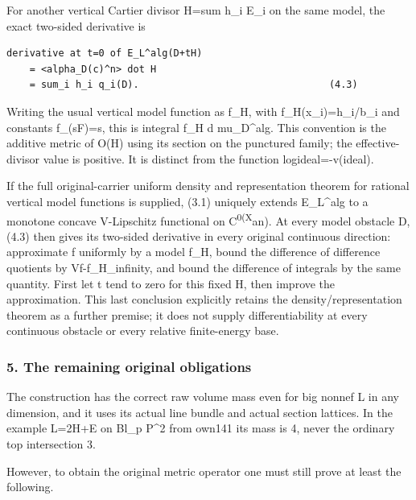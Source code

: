\documentclass[
  10pt,
]{article}
\begin{document}
For another vertical Cartier divisor H=sum h\_i E\_i on the same model,
the exact two-sided derivative is

\begin{verbatim}
derivative at t=0 of E_L^alg(D+tH)
    = <alpha_D(c)^n> dot H
    = sum_i h_i q_i(D).                                 (4.3)
\end{verbatim}

Writing the usual vertical model function as f\_H, with
f\_H(x\_i)=h\_i/b\_i and constants f\_(sF)=s, this is integral f\_H d
mu\_D\^{}alg. This convention is the additive metric of O(H) using its
section on the punctured family; the effective-divisor value is
positive. It is distinct from the function
log\textbar ideal\textbar=-v(ideal).

If the full original-carrier uniform density and representation theorem
for rational vertical model functions is supplied, (3.1) uniquely
extends E\_L\^{}alg to a monotone concave V-Lipschitz functional on
C\textsuperscript{0(X}an). At every model obstacle D, (4.3) then gives
its two-sided derivative in every original continuous direction:
approximate f uniformly by a model f\_H, bound the difference of
difference quotients by
V\textbar\textbar f-f\_H\textbar\textbar\_infinity, and bound the
difference of integrals by the same quantity. First let t tend to zero
for this fixed H, then improve the approximation. This last conclusion
explicitly retains the density/representation theorem as a further
premise; it does not supply differentiability at every continuous
obstacle or every relative finite-energy base.

\subsubsection{5. The remaining original
obligations}\label{the-remaining-original-obligations}

The construction has the correct raw volume mass even for big nonnef L
in any dimension, and it uses its actual line bundle and actual section
lattices. In the example L=2H+E on Bl\_p P\^{}2 from own141 its mass is
4, never the ordinary top intersection 3.

However, to obtain the original metric operator one must still prove at
least the following.
\end{document}
